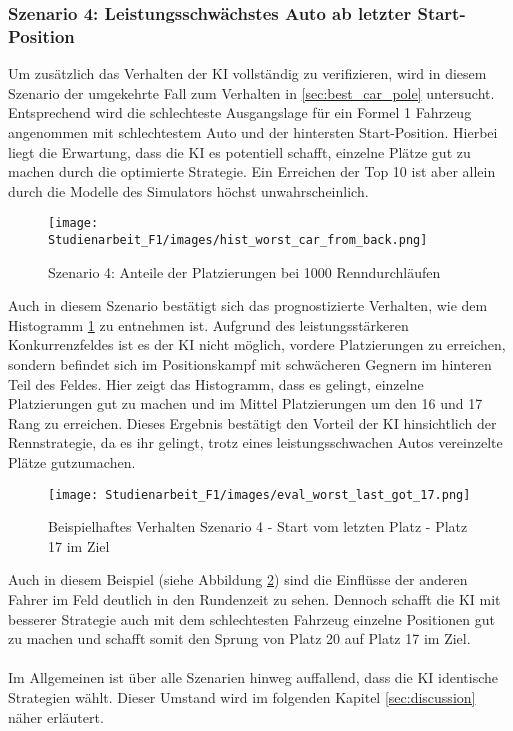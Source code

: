 \subsubsection{Szenario 4: Leistungsschwächstes Auto ab letzter Start-Position}

Um zusätzlich das Verhalten der KI vollständig zu verifizieren, wird in diesem Szenario der umgekehrte Fall zum Verhalten in \ref{sec:best_car_pole} untersucht. Entsprechend wird die schlechteste Ausgangslage für ein Formel 1 Fahrzeug angenommen mit schlechtestem Auto und der hintersten Start-Position. Hierbei liegt die Erwartung, dass die KI es potentiell schafft, einzelne Plätze gut zu machen durch die optimierte Strategie. Ein Erreichen der Top 10 ist aber allein durch die Modelle des Simulators höchst unwahrscheinlich.
\\
\begin{figure}[H]
    \centering
    \texttt{[image: Studienarbeit\_F1/images/hist\_worst\_car\_from\_back.png]}
    \caption{Szenario 4: Anteile der Platzierungen bei 1000 Renndurchläufen}
    \label{fig:hist_worst_car_from_back}
\end{figure}
Auch in diesem Szenario bestätigt sich das prognostizierte Verhalten, wie dem Histogramm \ref{fig:hist_worst_car_from_back} zu entnehmen ist. Aufgrund des leistungsstärkeren Konkurrenzfeldes ist es der KI nicht möglich, vordere Platzierungen zu erreichen, sondern befindet sich im Positionskampf mit schwächeren Gegnern im hinteren Teil des Feldes. Hier zeigt das Histogramm, dass es gelingt, einzelne Platzierungen gut zu machen und im Mittel Platzierungen um den 16 und 17 Rang zu erreichen. Dieses Ergebnis bestätigt den Vorteil der KI hinsichtlich der Rennstrategie, da es ihr gelingt, trotz eines leistungsschwachen Autos vereinzelte Plätze gutzumachen.
\\
\begin{figure}[H]
    \texttt{[image: Studienarbeit\_F1/images/eval\_worst\_last\_got\_17.png]}
    \caption{Beispielhaftes Verhalten Szenario 4 - Start vom letzten Platz - Platz 17 im Ziel}
    \label{fig:example_scenario_four}
\end{figure}
Auch in diesem Beispiel (siehe Abbildung \ref{fig:example_scenario_four}) sind die Einflüsse der anderen Fahrer im Feld deutlich in den Rundenzeit zu sehen. Dennoch schafft die KI mit besserer Strategie auch mit dem schlechtesten Fahrzeug einzelne Positionen gut zu machen und schafft somit den Sprung von Platz 20 auf Platz 17 im Ziel.\\\\
Im Allgemeinen ist über alle Szenarien hinweg auffallend, dass die KI identische Strategien wählt. Dieser Umstand wird im folgenden Kapitel \ref{sec:discussion} näher erläutert.



